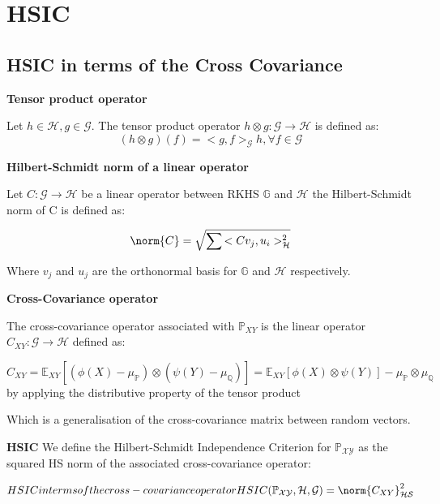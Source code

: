 \section{HSIC\label{P:HSIC}}

\subsection{HSIC in terms of the Cross Covariance\label{P:HSCC}}

\begin{defn}
\textsf{\textbf{Tensor product operator}}

Let $h \in \mathcal{H},g \in \mathcal{G}$. The tensor product operator $h \otimes g: \mathcal{G}\rightarrow\mathcal{H}$ is defined as:
\vspace{5mm}
$$(h \otimes g)(f) = <g,f>_{\mathcal{G}}h, \forall f \in \mathcal{G}$$
\end{defn}
\begin{defn}
\textsf{\textbf{Hilbert-Schmidt norm of a linear operator}}

Let $C:\mathcal{G}\rightarrow\mathcal{H}$ be a linear operator between RKHS $\mathbb{G} $ and $\mathcal{H}$ the Hilbert-Schmidt norm of C is defined as:

\vspace{5mm}
$$\norm{C} = \sqrt{\sum{<Cv_{j},u_{i}>^{2}_{\mathcal{H}}}}$$

Where {$v_{j}$} and {$u_{j}$} are the orthonormal basis for $\mathbb{G} $ and $\mathcal{H}$ respectively.
\end{defn}
\begin{defn}
\textsf{\textbf{Cross-Covariance operator}}

The cross-covariance operator associated with $\mathbb{P}_{XY}$ is the linear operator $C_{XY}:\mathcal{G}\rightarrow\mathcal{H}$ defined as:

\vspace{5mm}
$$C_{XY} = \mathbb{E}_{XY}[(\phi(X)-\mu_{\mathbb{P}}) \otimes (\psi(Y) -\mu_{\mathbb{Q}})] = \mathbb{E}_{XY}[\phi(X) \otimes \psi(Y)] - \mu_{\mathbb{P}} \otimes \mu_{\mathbb{Q}} $$
by applying the distributive property of the tensor product

Which is a generalisation of the cross-covariance matrix between random vectors.
\end{defn}
\begin{defn}
\textsf{\textbf{HSIC}}
We define the Hilbert-Schmidt Independence Criterion for $\mathbb{P}_{\mathcal{X}\mathcal{Y}}$ as the squared HS norm of the associated cross-covariance operator:

\begin{equation}{HSIC in terms of the cross-covariance operator}
HSIC(\mathbb{P}_{\mathcal{X}\mathcal{Y}},\mathcal{H},\mathcal{G}) = \norm{C_{XY}}^{2}_{\mathcal{HS}}
\end{equation}

\end{defn}
\newpage
